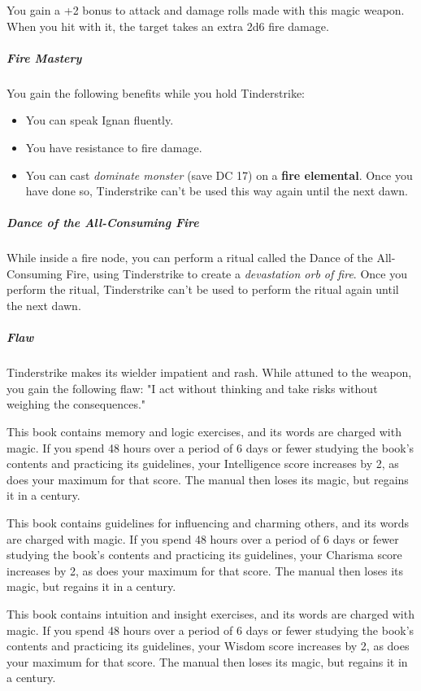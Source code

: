 \documentclass[10pt,a4paper,twoside,bg=print,twocolumn,openany,nodeprecatedcode]{dndbook}
\begin{document}
You gain a +2 bonus to attack and damage rolls made with this magic weapon. When you hit with it, the target takes an extra 2d6 fire damage.

\subparagraph{Fire Mastery}
You gain the following benefits while you hold Tinderstrike:


\begin{itemize}
\item You can speak Ignan fluently.
\item You have resistance to fire damage.
\item You can cast \textit{dominate monster} (save DC 17) on a \textbf{fire elemental}. Once you have done so, Tinderstrike can't be used this way again until the next dawn.
\end{itemize}

\subparagraph{Dance of the All-Consuming Fire}
While inside a fire node, you can perform a ritual called the Dance of the All-Consuming Fire, using Tinderstrike to create a \textit{devastation orb of fire}. Once you perform the ritual, Tinderstrike can't be used to perform the ritual again until the next dawn.

\subparagraph{Flaw}
Tinderstrike makes its wielder impatient and rash. While attuned to the weapon, you gain the following flaw: "I act without thinking and take risks without weighing the consequences."

This book contains memory and logic exercises, and its words are charged with magic. If you spend 48 hours over a period of 6 days or fewer studying the book's contents and practicing its guidelines, your Intelligence score increases by 2, as does your maximum for that score. The manual then loses its magic, but regains it in a century.

This book contains guidelines for influencing and charming others, and its words are charged with magic. If you spend 48 hours over a period of 6 days or fewer studying the book's contents and practicing its guidelines, your Charisma score increases by 2, as does your maximum for that score. The manual then loses its magic, but regains it in a century.

This book contains intuition and insight exercises, and its words are charged with magic. If you spend 48 hours over a period of 6 days or fewer studying the book's contents and practicing its guidelines, your Wisdom score increases by 2, as does your maximum for that score. The manual then loses its magic, but regains it in a century.
\end{document}
